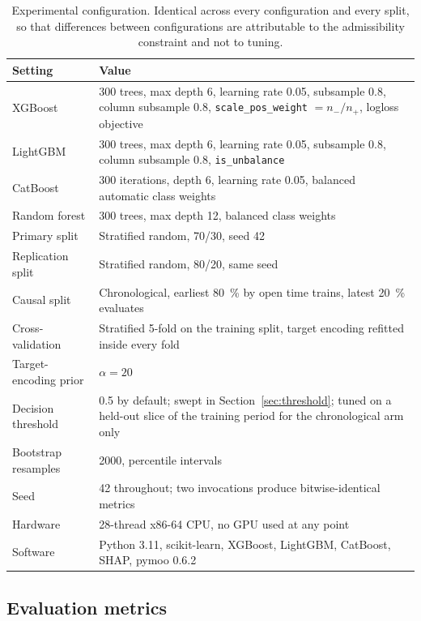 \begin{table}[htbp]
\centering
\caption{Experimental configuration. Identical across every configuration and every split, so
that differences between configurations are attributable to the admissibility constraint and
not to tuning.}
\label{tab:config}
\begin{tabular}{lL{9.4cm}}
\toprule
Setting & Value \\
\midrule
XGBoost & 300 trees, max depth 6, learning rate 0.05, subsample 0.8, column subsample 0.8, \texttt{scale\_pos\_weight} $=n_-/n_+$, logloss objective \\
LightGBM & 300 trees, max depth 6, learning rate 0.05, subsample 0.8, column subsample 0.8, \texttt{is\_unbalance} \\
CatBoost & 300 iterations, depth 6, learning rate 0.05, balanced automatic class weights \\
Random forest & 300 trees, max depth 12, balanced class weights \\
\midrule
Primary split & Stratified random, \num{70}/\num{30}, seed 42 \\
Replication split & Stratified random, \num{80}/\num{20}, same seed \\
Causal split & Chronological, earliest \SI{80}{\percent} by open time trains, latest \SI{20}{\percent} evaluates \\
Cross-validation & Stratified 5-fold on the training split, target encoding refitted inside every fold \\
Target-encoding prior & $\alpha = 20$ \\
Decision threshold & 0.5 by default; swept in Section~\ref{sec:threshold}; tuned on a held-out slice of the training period for the chronological arm only \\
Bootstrap resamples & 2000, percentile intervals \\
Seed & 42 throughout; two invocations produce bitwise-identical metrics \\
Hardware & 28-thread x86-64 CPU, no GPU used at any point \\
Software & Python 3.11, scikit-learn, XGBoost, LightGBM, CatBoost, SHAP, pymoo 0.6.2 \\
\bottomrule
\end{tabular}
\end{table}

\subsection{Evaluation metrics}
\label{sec:metrics}

